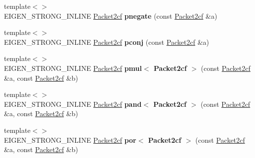 \begin{DoxyCompactItemize}
\item 
\mbox{\label{namespace_eigen_1_1internal_a7f6c6f991788c7f4724039e6d596339d}} 
{\footnotesize template$<$$>$ }\\E\+I\+G\+E\+N\+\_\+\+S\+T\+R\+O\+N\+G\+\_\+\+I\+N\+L\+I\+NE \hyperlink{struct_eigen_1_1internal_1_1_packet2cf}{Packet2cf} {\bfseries pnegate} (const \hyperlink{struct_eigen_1_1internal_1_1_packet2cf}{Packet2cf} \&a)
\item 
\mbox{\label{namespace_eigen_1_1internal_a09d3857508ad226b1c3fb2b8053a9857}} 
{\footnotesize template$<$$>$ }\\E\+I\+G\+E\+N\+\_\+\+S\+T\+R\+O\+N\+G\+\_\+\+I\+N\+L\+I\+NE \hyperlink{struct_eigen_1_1internal_1_1_packet2cf}{Packet2cf} {\bfseries pconj} (const \hyperlink{struct_eigen_1_1internal_1_1_packet2cf}{Packet2cf} \&a)
\item 
\mbox{\label{namespace_eigen_1_1internal_a4d20a8ab7348f9305982185550a06543}} 
{\footnotesize template$<$$>$ }\\E\+I\+G\+E\+N\+\_\+\+S\+T\+R\+O\+N\+G\+\_\+\+I\+N\+L\+I\+NE \hyperlink{struct_eigen_1_1internal_1_1_packet2cf}{Packet2cf} {\bfseries pmul$<$ Packet2cf $>$} (const \hyperlink{struct_eigen_1_1internal_1_1_packet2cf}{Packet2cf} \&a, const \hyperlink{struct_eigen_1_1internal_1_1_packet2cf}{Packet2cf} \&b)
\item 
\mbox{\label{namespace_eigen_1_1internal_ab433636bb8ef0295317cb233525409fe}} 
{\footnotesize template$<$$>$ }\\E\+I\+G\+E\+N\+\_\+\+S\+T\+R\+O\+N\+G\+\_\+\+I\+N\+L\+I\+NE \hyperlink{struct_eigen_1_1internal_1_1_packet2cf}{Packet2cf} {\bfseries pand$<$ Packet2cf $>$} (const \hyperlink{struct_eigen_1_1internal_1_1_packet2cf}{Packet2cf} \&a, const \hyperlink{struct_eigen_1_1internal_1_1_packet2cf}{Packet2cf} \&b)
\item 
\mbox{\label{namespace_eigen_1_1internal_a699a6917cdff3949223842bda57f0718}} 
{\footnotesize template$<$$>$ }\\E\+I\+G\+E\+N\+\_\+\+S\+T\+R\+O\+N\+G\+\_\+\+I\+N\+L\+I\+NE \hyperlink{struct_eigen_1_1internal_1_1_packet2cf}{Packet2cf} {\bfseries por$<$ Packet2cf $>$} (const \hyperlink{struct_eigen_1_1internal_1_1_packet2cf}{Packet2cf} \&a, const \hyperlink{struct_eigen_1_1internal_1_1_packet2cf}{Packet2cf} \&b)

\end{DoxyCompactItemize}
